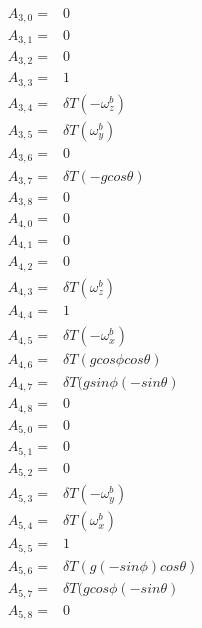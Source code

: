 \documentclass[conference]{IEEEtran}
\begin{document}
\begin{align*}
A_{3,0} =& 0\\
A_{3,1} =& 0\\
A_{3,2} =& 0\\
A_{3,3} =& 1 \\
A_{3,4} =& \delta T (-\omega_z^b) \\
A_{3,5} =& \delta T (\omega_y^b) \\
A_{3,6} =& 0 \\
A_{3,7} =& \delta T (-g cos \theta) \\
A_{3,8} =& 0\\
A_{4,0} =& 0\\
A_{4,1} =& 0\\
A_{4,2} =& 0\\
A_{4,3} =& \delta T (\omega_z^b) \\
A_{4,4} =& 1 \\
A_{4,5} =&  \delta T (-\omega_x^b) \\
A_{4,6} =& \delta T(g cos \phi cos \theta)\\
A_{4,7} =& \delta T (g sin \phi (-sin \theta) \\
A_{4,8} =& 0 \\
A_{5,0} =& 0\\
A_{5,1} =& 0\\
A_{5,2} =& 0\\
A_{5,3} =& \delta T (-\omega_y^b) \\
A_{5,4} =& \delta T (\omega_x^b) \\
A_{5,5} =&  1 \\
A_{5,6} =& \delta T(g (-sin \phi) cos \theta)\\
A_{5,7} =& \delta T (g cos \phi (-sin \theta) \\
A_{5,8} =& 0 \\
\end{align*}
\end{document}
